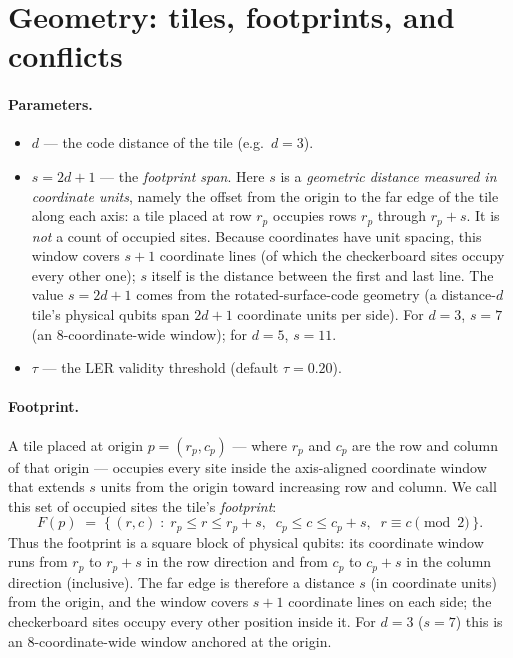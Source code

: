 \documentclass[11pt]{article}
\newcommand{\Fp}{F}
\begin{document}
\section{Geometry: tiles, footprints, and conflicts}
\label{sec:geometry}

\paragraph{Parameters.}
\begin{itemize}[itemsep=2pt]
  \item $d$ --- the code distance of the tile (e.g.\ $d = 3$).
  \item $s = 2d + 1$ --- the \emph{footprint span}. Here $s$ is a \emph{geometric distance
        measured in coordinate units}, namely the offset from the origin to the far edge of
        the tile along each axis: a tile placed at row $r_p$ occupies rows $r_p$ through
        $r_p + s$. It is \emph{not} a count of occupied sites. Because coordinates have unit
        spacing, this window covers $s+1$ coordinate lines (of which the checkerboard sites
        occupy every other one); $s$ itself is the distance between the first and last line.
        The value $s = 2d+1$ comes from the rotated-surface-code geometry (a distance-$d$
        tile's physical qubits span $2d+1$ coordinate units per side). For $d=3$, $s = 7$
        (an $8$-coordinate-wide window); for $d=5$, $s = 11$.
  \item $\tau$ --- the LER validity threshold (default $\tau = 0.20$).
\end{itemize}

\paragraph{Footprint.}
A tile placed at origin $p = (r_p, c_p)$ --- where $r_p$ and $c_p$ are the row and column of
that origin --- occupies every site inside the axis-aligned coordinate window that extends
$s$ units from the origin toward increasing row and column. We call this set of occupied
sites the tile's \emph{footprint}:
\[
  \Fp(p) \;=\; \bigl\{\, (r, c) \;:\; r_p \le r \le r_p + s,\;\;
  c_p \le c \le c_p + s,\;\; r \equiv c \!\!\pmod 2 \,\bigr\}.
\]
Thus the footprint is a square block of physical qubits: its coordinate window runs from
$r_p$ to $r_p + s$ in the row direction and from $c_p$ to $c_p + s$ in the column direction
(inclusive). The far edge is therefore a distance $s$ (in coordinate units) from the origin,
and the window covers $s+1$ coordinate lines on each side; the checkerboard sites occupy
every other position inside it. For $d=3$ ($s=7$) this is an $8$-coordinate-wide window
anchored at the origin.
\end{document}
